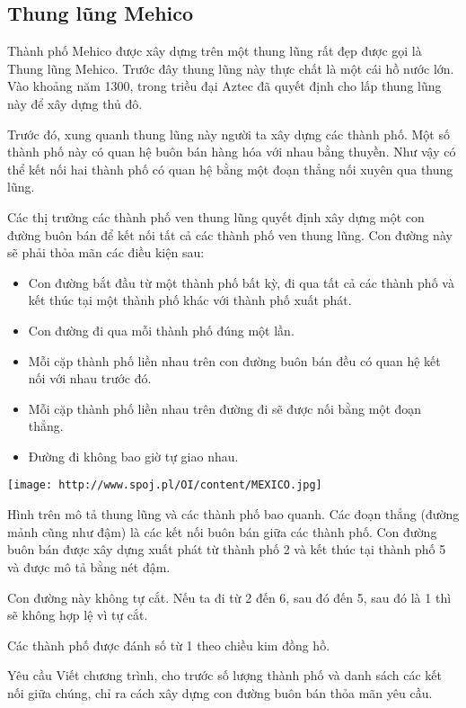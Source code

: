 \subsection{   Thung lũng Mehico  }

   Thành phố Mehico được xây dựng trên một thung lũng rất đẹp được gọi là Thung lũng Mehico. Trước đây thung lũng này thực chất là một cái hồ nước lớn. Vào khoảng năm 1300, trong triều đại Aztec đã quyết định cho lấp thung lũng này để xây dựng thủ đô.  

   Trước đó, xung quanh thung lũng này người ta xây dựng các thành phố. Một số thành phố này có quan hệ buôn bán hàng hóa với nhau bằng thuyền. Như vậy có thể kết nối hai thành phố có quan hệ bằng một đoạn thẳng nối xuyên qua thung lũng.  

   Các thị trưởng các thành phố ven thung lũng quyết định xây dựng một con đường buôn bán để kết nối tất cả các thành phố ven thung lũng. Con đường này sẽ phải thỏa mãn các điều kiện sau:  
\begin{itemize}
	\item     Con đường bắt đầu từ một thành phố bất kỳ, đi qua tất cả các thành phố và kết thúc tại một thành phố khác với thành phố xuất phát.   
	\item     Con đường đi qua mỗi thành phố đúng một lần.   
	\item     Mỗi cặp thành phố liền nhau trên con đường buôn bán đều có quan hệ kết nối với nhau trước đó.   
	\item     Mỗi cặp thành phố liền nhau trên đường đi sẽ được nối bằng một đoạn thẳng.   
	\item     Đường đi không bao giờ tự giao nhau.   
\end{itemize}


\texttt{[image: http://www.spoj.pl/OI/content/MEXICO.jpg]}

   Hình trên mô tả thung lũng và các thành phố bao quanh. Các đoạn thẳng (đường mảnh cũng như đậm) là các kết nối buôn bán giữa các thành phố. Con đường buôn bán được xây dựng xuất phát từ thành phố 2 và kết thúc tại thành phố 5 và được mô tả bằng nét đậm.  

   Con đường này không tự cắt. Nếu ta đi từ 2 đến 6, sau đó đến 5, sau đó là 1 thì sẽ không hợp lệ vì tự cắt.  

   Các thành phố được đánh số từ 1 theo chiều kim đồng hồ.  

Yêu cầu
Viết chương trình, cho trước số lượng thành phố và danh sách các kết nối giữa chúng, chỉ ra cách xây dựng con đường buôn bán thỏa mãn yêu cầu.